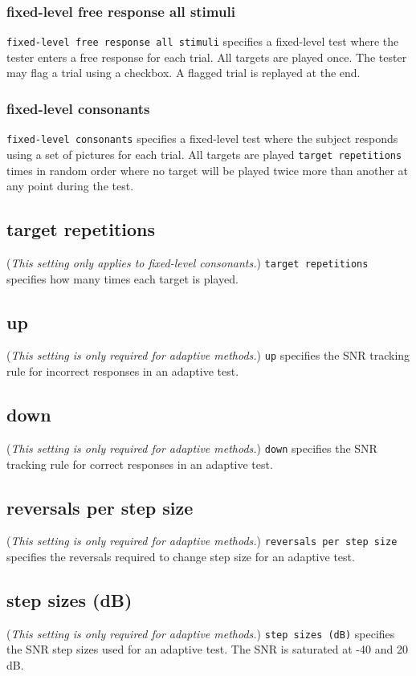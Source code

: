 \documentclass[11pt,pdftex,letterpaper]{article}
\begin{document}
\subsubsection{fixed-level free response all stimuli}
\texttt{fixed-level free response all stimuli} specifies a fixed-level test where the tester enters a free response for each trial. All targets are played once. The tester may flag a trial using a checkbox. A flagged trial is replayed at the end.
\subsubsection{fixed-level consonants}
\texttt{fixed-level consonants} specifies a fixed-level test where the subject responds using a set of pictures for each trial. All targets are played \texttt{target repetitions} times in random order where no target will be played twice more than another at any point during the test. 
\subsection{target repetitions}
(\textit{This setting only applies to fixed-level consonants.}) \texttt{target repetitions} specifies how many times each target is played. 
\subsection{up}
(\textit{This setting is only required for adaptive methods.}) \texttt{up} specifies the SNR tracking rule for incorrect responses in an adaptive test.
\subsection{down}
(\textit{This setting is only required for adaptive methods.}) \texttt{down} specifies the SNR tracking rule for correct responses in an adaptive test.
\subsection{reversals per step size}
(\textit{This setting is only required for adaptive methods.}) \texttt{reversals per step size} specifies the reversals required to change step size for an adaptive test.
\subsection{step sizes (dB)}
(\textit{This setting is only required for adaptive methods.}) \texttt{step sizes (dB)} specifies the SNR step sizes used for an adaptive test. The SNR is saturated at -40 and 20 dB.
\end{document}
